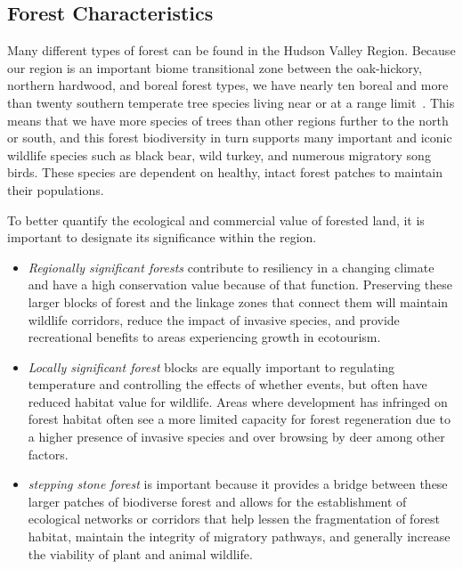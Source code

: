 \subsection*{Forest Characteristics}\label{subsec:forestcharacteristics}
Many different types of forest can be found in the Hudson Valley Region.
Because our region is an important biome transitional zone between the
oak-hickory, northern hardwood, and boreal forest types, we have nearly ten
boreal and more than twenty southern temperate tree species living near or at a
range limit~\citep{ldeo}. This means that we have more species of trees than other regions
further to the north or south, and this forest biodiversity in turn supports
many important and iconic wildlife species such as black bear, wild turkey, and
numerous migratory song birds. These species are dependent on healthy, intact
forest patches to maintain their populations.
\par
To better quantify the ecological and commercial value of forested land, it is
important to designate its significance within the region.
\begin{itemize}
    \item \textit{Regionally significant forests} contribute to resiliency in a
        changing climate and have a high conservation value because of that
        function. Preserving these larger blocks of forest and the linkage zones that
        connect them will maintain wildlife corridors, reduce the impact of invasive
        species, and provide recreational benefits to areas experiencing growth in
        eco\-tourism. 
    \item \textit{Locally significant forest} blocks are equally important to regulating temperature and controlling the effects of whether
        events, but often have reduced habitat value for wildlife. Areas where
        development has infringed on forest habitat often see a more limited
        capacity for forest regeneration due to a higher presence of invasive
        species and over browsing by deer among other factors. 
    \item \textit{stepping stone forest} is important because it provides a
        bridge between these larger patches of biodiverse forest and allows
        for the establishment of ecological networks or corridors that help
        lessen the fragmentation of forest habitat, maintain the integrity
        of migratory pathways, and generally increase the viability of
        plant and animal wildlife.
\end{itemize}

